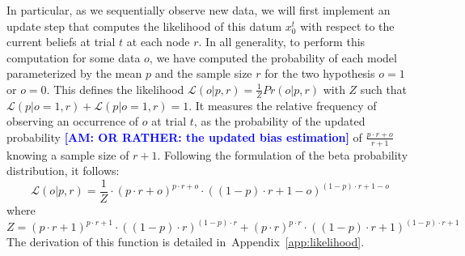 \documentclass[12pt,english]{article}%
\newcommand{\eq}[1]{\begin{equation*}#1\end{equation*}}
\newcommand{\eql}[1]{\begin{equation}#1\end{equation}}
\newcommand{\Ll}{\mathcal{L}}
\newcommand{\citep}[1]{\parencite{#1}}
\newcommand{\seeApp}[1]{Appendix~\ref{app:#1}}
\newcommand{\AM}[1]{\textbf{\textcolor{blue}{[AM: #1]}}}
\begin{document}
In particular, as we sequentially observe new data, 
we will first implement an update step that 
computes the likelihood of this datum $x_0^t$ with respect to 
the current beliefs at trial $t$ at each node $r$.
In all generality, to perform this computation for some data $o$, 
we have computed the probability of each model 
parameterized by the mean $p$ and the sample size $r$
for the two hypothesis $o=1$ or $o=0$.
This defines the likelihood
$\Ll(o | p, r) = \frac{1}{Z} Pr(o |p, r)$ 
with $Z$ such that $\Ll(p | o=1, r) + \Ll(p | o=1, r)=1$.
It measures the relative frequency of observing an occurrence of $o$ at trial $t$,
as the probability of the updated probability 
\AM{OR RATHER: the updated bias estimation} of $\frac{p\cdot r + o}{r+1}$
knowing a sample size of $r+1$.
Following the formulation of the beta probability distribution, it follows:
\eql{%
\Ll(o | p, r) = \frac{1}{Z} \cdot {(p\cdot r + o)}^{p\cdot r + o} \cdot {((1- p)\cdot r + 1- o)}^{(1- p)\cdot r + 1- o} 
\label{eq:likelihood}
}
where 
\eq{
Z = {(p\cdot r + 1)}^{p\cdot r + 1}  \cdot {((1- p)\cdot r )}^{(1- p)\cdot r }  +
    {(p\cdot r )}^{p\cdot r }  \cdot {((1- p)\cdot r + 1)}^{(1- p)\cdot r + 1} 
}
The derivation of this function is detailed in~\seeApp{likelihood}.
\end{document}

